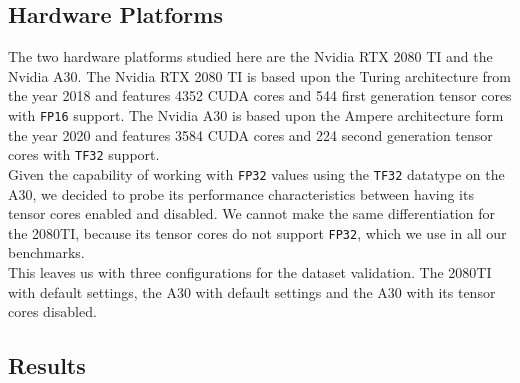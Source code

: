 
\subsection{Hardware Platforms}
The two hardware platforms studied here are the Nvidia RTX 2080 TI and the Nvidia A30. The Nvidia RTX 2080 TI is based upon the Turing architecture from the year 2018 and features 4352 CUDA cores and 544 first generation tensor cores with \texttt{FP16} support. The Nvidia A30 is based upon the Ampere architecture form the year 2020 and features 3584 CUDA cores and 224 second generation tensor cores with \texttt{TF32} support.\\
Given the capability of working with \texttt{FP32} values using the \texttt{TF32} datatype on the A30, we decided to probe its performance characteristics between having its tensor cores enabled and disabled. We cannot make the same differentiation for the 2080TI, because its tensor cores do not support \texttt{FP32}, which we use in all our benchmarks. \\
This leaves us with three configurations for the dataset validation. The 2080TI with default settings, the A30 with default settings and the A30 with its tensor cores disabled.


\subsection{Results}

